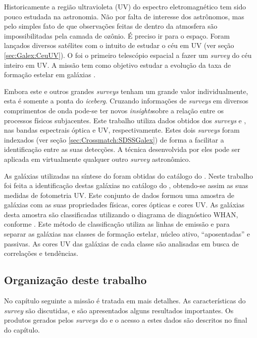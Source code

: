 Historicamente a região ultravioleta (UV) do espectro eletromagnético tem sido
pouco estudada na astronomia. Não por falta de interesse dos astrônomos, mas
pelo simples fato de que observações feitas de dentro da atmosfera são
impossibilitadas pela camada de ozônio. É preciso ir para o espaço. Foram
lançados diversos satélites com o intuito de estudar o céu em UV (ver seção
\ref{sec:Galex:CeuUV}). O \galex foi o primeiro telescópio espacial a fazer um
{\em survey} do céu inteiro em UV. A missão tem como objetivo estudar a evolução
da taxa de formação estelar em galáxias \citep{Martin2005}.

Embora este e outros grandes {\em surveys} tenham um grande valor
individualmente, esta é somente a ponta do {\em iceberg}. Cruzando informações
de {\em surveys} em diversos comprimentos de onda pode-se ter novos {\em
insights}\fixme sobre a relação entre os processos físicos subjacentes. Este
trabalho utiliza dados obtidos dos {\em surveys} \SDSS e \galex, nas bandas
espectrais óptica e UV, respectivamente. Estes dois {\em surveys} foram
indexados (ver seção \ref{sec:Crossmatch:SDSSGalex}) de forma a facilitar a
identificação entre as suas detecções. A técnica desenvolvida por eles pode ser
aplicada em virtualmente qualquer outro {\em survey} astronômico.

As galáxias utilizadas na síntese do \starlight foram obtidas do catálogo do
\SDSS. Neste trabalho foi feita a identificação destas galáxias no catálogo do
\galex, obtendo-se assim as suas medidas de fotometria UV. Este conjunto de
dados formou uma amostra de galáxias com as suas propriedades físicas, cores
ópticas e cores UV. As galáxias desta amostra são classificadas utilizando o
diagrama de diagnóstico WHAN, conforme \citet{CidFernandes2011}. Este método de
classificação utiliza as linhas de emissão \Halpha e \NII para separar as
galáxias nas classes de formação estelar, núcleo ativo, ``aposentadas'' e
passivas. As cores UV das galáxias de cada classe são analisadas em busca de
correlações e tendências.

\subsection{Organização deste trabalho}

No capítulo seguinte a missão \galex é tratada em mais detalhes. As
características do {\em survey} são discutidas, e são apresentados alguns
resultados importantes. Os produtos gerados pelos {\em surveys} do \galex e o
acesso a estes dados são descritos no final do capítulo.

